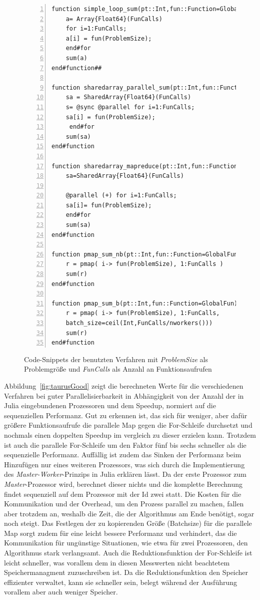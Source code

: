 \documentclass[proseminar,german,utf8]{zihpub}
\begin{document}
\begin{figure}[hbt!]
\begin{Verbatim}[baselinestretch=1,fontsize=\scriptsize,numbers=left,frame=single,stepnumber=5,xleftmargin=1cm,xrightmargin=1cm]
function simple_loop_sum(pt::Int,fun::Function=GlobalFun)
    a= Array{Float64}(FunCalls)
    for i=1:FunCalls; 
	a[i] = fun(ProblemSize); 
	end#for
    sum(a)
end#function##

function sharedarray_parallel_sum(pt::Int,fun::Function=GlobalFun)
    sa = SharedArray{Float64}(FunCalls)
    s= @sync @parallel for i=1:FunCalls; 
	sa[i] = fun(ProblemSize);
	 end#for
    sum(sa)
end#function

function sharedarray_mapreduce(pt::Int,fun::Function=GlobalFun)
    sa=SharedArray{Float64}(FunCalls)

    @parallel (+) for i=1:FunCalls; 
	sa[i]= fun(ProblemSize); 
	end#for
    sum(sa)
end#function

function pmap_sum_nb(pt::Int,fun::Function=GlobalFun)
    r = pmap( i-> fun(ProblemSize), 1:FunCalls )
    sum(r)
end#function

function pmap_sum_b(pt::Int,fun::Function=GlobalFun)
    r = pmap( i-> fun(ProblemSize), 1:FunCalls, 
	batch_size=ceil(Int,FunCalls/nworkers()))
    sum(r)
end#function
\end{Verbatim}
  \caption{Code-Snippets der benutzten Verfahren mit \textit{ProblemSize} als Problemgröße und  \textit{FunCalls} als Anzahl an Funktionsaufrufen}
 \label{fig:CodeSnippet}
\end{figure}

Abbildung~\ref{fig:taurusGood} zeigt die berechneten Werte für die verschiedenen Verfahren bei guter Parallelisierbarkeit in Abhängigkeit von der Anzahl der in Julia eingebundenen Prozessoren und dem Speedup, normiert auf die sequenziellen Performanz. Gut zu erkennen ist, das sich für weniger, aber dafür größere Funktionsaufrufe die parallele Map gegen die For-Schleife durchsetzt und nochmals einen doppelten Speedup im vergleich zu dieser erzielen kann. Trotzdem ist auch die parallele For-Schleife um den Faktor fünf bis sechs schneller als die sequenzielle Performanz. Auffällig ist zudem das Sinken der Performanz beim Hinzufügen nur eines weiteren Prozessors, was sich durch die Implementierung des \textit{Master-Worker}-Prinzips in Julia erklären lässt. Da der erste Prozessor zum \textit{Master}-Prozessor wird, berechnet dieser nichts und die komplette Berechnung findet sequenziell auf dem Prozessor mit der Id zwei statt. Die Kosten für die Kommunikation und der Overhead, um den Prozess parallel zu machen, fallen aber trotzdem an, weshalb die Zeit, die der Algorithmus am Ende benötigt, sogar noch steigt. Das Festlegen der zu kopierenden Größe (Batchsize) für die parallele Map sorgt zudem für eine leicht bessere Performanz und verhindert, das die Kommunikation für ungünstige Situationen, wie etwa für zwei Prozessoren, den Algorithmus stark verlangsamt. Auch die Reduktionsfunktion der For-Schleife ist leicht schneller, was vorallem dem in diesen Messwerten nicht beachtetem Speichermanagment zuzuschreiben ist. Da die Reduktionsfunktion den Speicher effizienter verwaltet, kann sie schneller sein, belegt während der Ausführung vorallem aber auch weniger Speicher.
\end{document}
